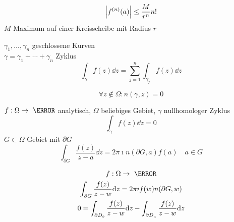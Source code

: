 \[ \abs{f^{(n)}(a)} \leq \frac{M}{r^n} n! \]
$M$ Maximum auf einer Kreisscheibe mit Radius $r$

$\gamma_1 , \dotsc , \gamma_n$ geschlossene Kurven \\
$\gamma = \gamma_1 + \dotsb + \gamma_n$ Zyklus \\
\[ \int_\gamma f(z) \dd z = \sum_{j=1}^n \int_{\gamma_j} f(z) \dd z \]

\begin{def*}[note = nullhomologer Zyklus , index = nullhomologer Zyklus , indexformat = {2!1 }]
	\[ \forall z \notin \Omega : n(\gamma , z) = 0 \]
\end{def*}

$f: \Omega \rightarrow \C$ analytisch, $\Omega$ beliebiges Gebiet, $\gamma$ nullhomologer Zyklus \\
\[ \int_\gamma f(z) \dd z = 0 \]
$G \subset \Omega$ Gebiet mit $\partial G$
\[ \int_{\partial G} \frac{f(z)}{z-a} \dd z =2\pi\imath n( \partial G , a ) f(a) \quad a \in G \]

\begin{gather*}
	f: \Omega \rightarrow \C \\
	\int_{\partial G} \frac{f(z)}{z-w} \dd z = 2\pi\imath f(w) n( \partial G , w ) \\
	0 = \int_{\partial D_b} \frac{f(z)}{z-w} \dd z - \int_{\partial D_a} \frac{f(z)}{z-w} \dd z
\end{gather*}

